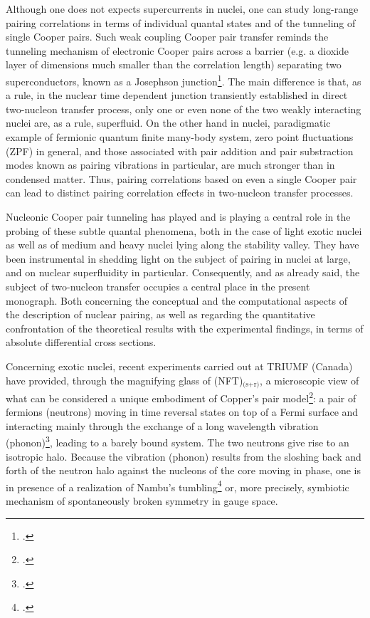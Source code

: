  
  Although one does not expects supercurrents in nuclei, one can study long-range pairing correlations in terms of individual quantal states and of the tunneling of single Cooper pairs. Such weak coupling Cooper pair transfer reminds  the tunneling mechanism of electronic Cooper pairs across a barrier (e.g. a dioxide layer of dimensions much smaller than the correlation length) separating two superconductors, known as a Josephson junction\footnote{\cite{Josephson:62,Anderson:64b}.}. The main difference is that, as a rule, in the nuclear time dependent junction transiently established in  direct two-nucleon transfer process, only one or even none of the two weakly interacting nuclei are, as a rule, superfluid.  On the other hand in nuclei, paradigmatic example of fermionic quantum  finite many-body system, zero point fluctuations  (ZPF) in general, and those associated with pair addition and pair substraction modes known as pairing vibrations in particular, are much stronger than in condensed matter. Thus, pairing correlations based on even  a single Cooper pair can lead to distinct pairing correlation effects in two-nucleon transfer processes. 
  
  
 Nucleonic Cooper pair tunneling has played and is playing a central role in the probing of these subtle quantal phenomena, both in the case of  light exotic nuclei as well as of medium and heavy nuclei lying along the stability valley. They  have been instrumental in shedding light on the subject of pairing in nuclei at large, and on nuclear superfluidity in particular. Consequently, and as already said, the subject of two-nucleon transfer occupies  a central place in the present monograph. Both concerning the conceptual and the computational aspects of the description of nuclear pairing, as well as regarding the quantitative confrontation of the theoretical  results  with the experimental findings, in terms of absolute differential cross sections.

Concerning exotic nuclei, recent experiments carried out at TRIUMF (Canada) have provided, through the magnifying glass of (NFT)$_\text{(s+r)}$, a microscopic view of what can be considered a unique embodiment of Copper's pair model\footnote{\cite{Cooper:56}.}: a pair of fermions (neutrons) moving in time reversal states on top of a  Fermi surface and interacting mainly through the exchange of a long wavelength vibration (phonon)\footnote{\cite{Frohlich:52,Bardeen:55,Bardeen:57a,Bardeen:57b}.}, leading to a barely bound system. The two neutrons give rise to an isotropic halo. Because the vibration (phonon) results from the sloshing back and forth of the neutron halo against the  nucleons of the core moving in phase, one is in presence of a realization of Nambu's tumbling\footnote{\cite{Nambu:91}.} or, more precisely, symbiotic mechanism of spontaneously broken symmetry in gauge space.

